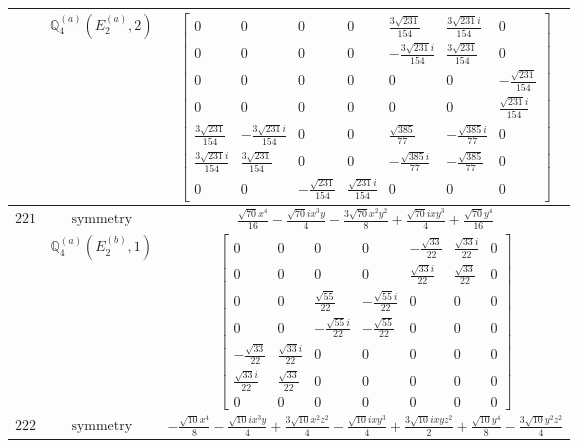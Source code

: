 \documentclass[fleqn,8pt,landscape]{jsarticle}
\begin{document}
\begin{longtable}{ccc}
$  $ & $ \mathbb{Q}_{4}^{(a)}(E_{2}^{(a)},2) $ & $ \begin{bmatrix} 0 & 0 & 0 & 0 & \frac{3 \sqrt{231}}{154} & \frac{3 \sqrt{231} i}{154} & 0 \\ 0 & 0 & 0 & 0 & - \frac{3 \sqrt{231} i}{154} & \frac{3 \sqrt{231}}{154} & 0 \\ 0 & 0 & 0 & 0 & 0 & 0 & - \frac{\sqrt{231}}{154} \\ 0 & 0 & 0 & 0 & 0 & 0 & \frac{\sqrt{231} i}{154} \\ \frac{3 \sqrt{231}}{154} & - \frac{3 \sqrt{231} i}{154} & 0 & 0 & \frac{\sqrt{385}}{77} & - \frac{\sqrt{385} i}{77} & 0 \\ \frac{3 \sqrt{231} i}{154} & \frac{3 \sqrt{231}}{154} & 0 & 0 & - \frac{\sqrt{385} i}{77} & - \frac{\sqrt{385}}{77} & 0 \\ 0 & 0 & - \frac{\sqrt{231}}{154} & \frac{\sqrt{231} i}{154} & 0 & 0 & 0 \end{bmatrix} $ \\ \hline
$ 221 $ & $ \text{symmetry} $ & $ \frac{\sqrt{70} x^{4}}{16} - \frac{\sqrt{70} i x^{3} y}{4} - \frac{3 \sqrt{70} x^{2} y^{2}}{8} + \frac{\sqrt{70} i x y^{3}}{4} + \frac{\sqrt{70} y^{4}}{16} $ \\
$  $ & $ \mathbb{Q}_{4}^{(a)}(E_{2}^{(b)},1) $ & $ \begin{bmatrix} 0 & 0 & 0 & 0 & - \frac{\sqrt{33}}{22} & \frac{\sqrt{33} i}{22} & 0 \\ 0 & 0 & 0 & 0 & \frac{\sqrt{33} i}{22} & \frac{\sqrt{33}}{22} & 0 \\ 0 & 0 & \frac{\sqrt{55}}{22} & - \frac{\sqrt{55} i}{22} & 0 & 0 & 0 \\ 0 & 0 & - \frac{\sqrt{55} i}{22} & - \frac{\sqrt{55}}{22} & 0 & 0 & 0 \\ - \frac{\sqrt{33}}{22} & \frac{\sqrt{33} i}{22} & 0 & 0 & 0 & 0 & 0 \\ \frac{\sqrt{33} i}{22} & \frac{\sqrt{33}}{22} & 0 & 0 & 0 & 0 & 0 \\ 0 & 0 & 0 & 0 & 0 & 0 & 0 \end{bmatrix} $ \\ \hline
$ 222 $ & $ \text{symmetry} $ & $ - \frac{\sqrt{10} x^{4}}{8} - \frac{\sqrt{10} i x^{3} y}{4} + \frac{3 \sqrt{10} x^{2} z^{2}}{4} - \frac{\sqrt{10} i x y^{3}}{4} + \frac{3 \sqrt{10} i x y z^{2}}{2} + \frac{\sqrt{10} y^{4}}{8} - \frac{3 \sqrt{10} y^{2} z^{2}}{4} $ \\

\end{longtable}
\end{document}
